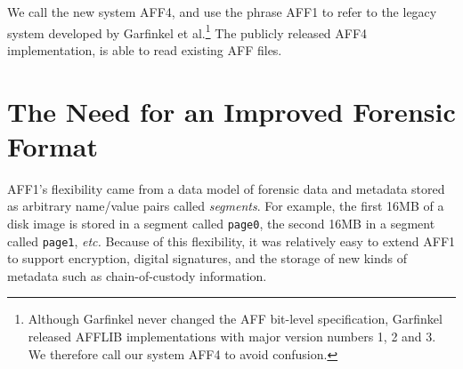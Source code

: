 \documentclass[10pt, conference]{IEEEtran}
\begin{document}
We call the new system AFF4, and use the phrase AFF1 to refer to the
legacy system developed by Garfinkel et al.\footnote{Although
Garfinkel never changed the AFF bit-level specification, Garfinkel
released AFFLIB implementations with major version numbers 1, 2 and
3. We therefore call our system AFF4 to avoid confusion.} The publicly
released AFF4 implementation, is able to read existing AFF files.





\section{The Need for an Improved Forensic Format}

AFF1's flexibility came from a data model of forensic data and metadata
stored as arbitrary name/value pairs called \emph{segments}. For
example, the first 16MB of a disk image is stored in a segment called
\texttt{page0}, the second 16MB in a segment called \texttt{page1},
\emph{etc.} Because of this flexibility, it was relatively easy 
to extend AFF1 to support encryption, digital signatures, and the
storage of new kinds of metadata such as chain-of-custody
information\cite{garfinkel:affcrypto}.
\end{document}
